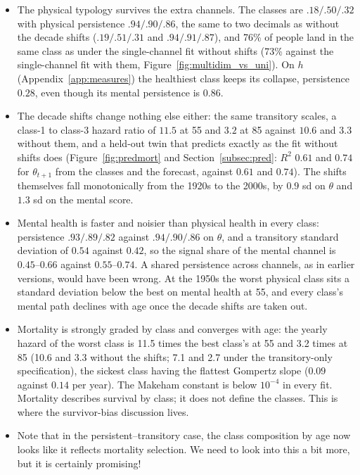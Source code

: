 \documentclass[11pt]{article}
\begin{document}
\begin{itemize}
		\item The physical typology survives the extra channels. The classes are $.18/.50/.32$ with physical persistence $.94/.90/.86$, the same to two decimals as without the decade shifts ($.19/.51/.31$ and $.94/.91/.87$), and 76\% of people land in the same class as under the single-channel fit without shifts (73\% against the single-channel fit with them, Figure~\ref{fig:multidim_vs_uni}). On $h$ (Appendix~\ref{app:measures}) the healthiest class keeps its collapse, persistence $0.28$, even though its mental persistence is $0.86$.
		\item The decade shifts change nothing else either: the same transitory scales, a class-1 to class-3 hazard ratio of $11.5$ at 55 and $3.2$ at 85 against $10.6$ and $3.3$ without them, and a held-out twin that predicts exactly as the fit without shifts does (Figure~\ref{fig:predmort} and Section~\ref{subsec:pred}: $R^2$ $0.61$ and $0.74$ for $\theta_{t+1}$ from the classes and the forecast, against $0.61$ and $0.74$). The shifts themselves fall monotonically from the 1920s to the 2000s, by $0.9$ sd on $\theta$ and $1.3$ sd on the mental score.
		\item Mental health is faster and noisier than physical health in every class: persistence $.93/.89/.82$ against $.94/.90/.86$ on $\theta$, and a transitory standard deviation of $0.54$ against $0.42$, so the signal share of the mental channel is $0.45$--$0.66$ against $0.55$--$0.74$. A shared persistence across channels, as in earlier versions, would have been wrong. At the 1950s the worst physical class sits a standard deviation below the best on mental health at 55, and every class's mental path declines with age once the decade shifts are taken out.
		\item Mortality is strongly graded by class and converges with age: the yearly hazard of the worst class is 11.5 times the best class's at 55 and 3.2 times at 85 (10.6 and 3.3 without the shifts; 7.1 and 2.7 under the transitory-only specification), the sickest class having the flattest Gompertz slope ($0.09$ against $0.14$ per year). The Makeham constant is below $10^{-4}$ in every fit. Mortality describes survival by class; it does not define the classes. This is where the survivor-bias discussion lives.
		\item Note that in the persistent--transitory case, the class composition by age now looks like it reflects mortality selection. We need to look into this a bit more, but it is certainly promising!

\end{itemize}
\end{document}
